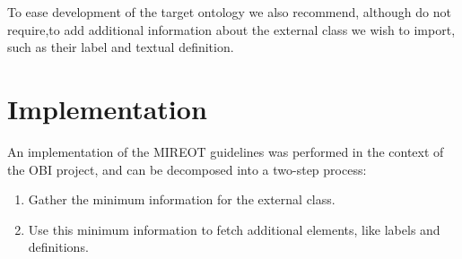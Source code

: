 \documentclass[a4paper,10pt,twocolumn]{article}
\newcommand{\protege}{Prot\'{e}g\'{e}}
\begin{document}


To ease development of the target ontology we also recommend, although do not require,to add additional information about the external class we wish to import, such as their label and textual definition.








\section*{Implementation}

An implementation of the \ac{MIREOT} guidelines was performed in the context of the \ac{OBI} project, and can be decomposed into a two-step process:

\begin{enumerate}
\item Gather the minimum information for the external class.
\item Use this minimum information to fetch additional elements, like labels and definitions.
\end{enumerate}
\end{document}
